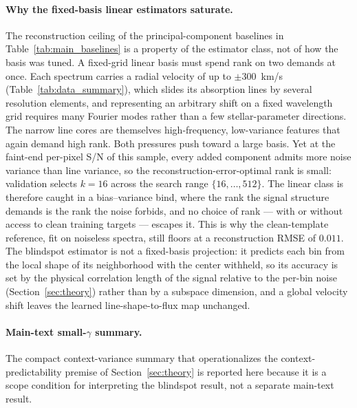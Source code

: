 \documentclass[twocolumn]{aastex7}
\begin{document}
\paragraph{Why the fixed-basis linear estimators saturate.} The reconstruction ceiling of the principal-component baselines in Table~\ref{tab:main_baselines} is a property of the estimator class, not of how the basis was tuned. A fixed-grid linear basis must spend rank on two demands at once. Each spectrum carries a radial velocity of up to $\pm300$~km/s (Table~\ref{tab:data_summary}), which slides its absorption lines by several resolution elements, and representing an arbitrary shift on a fixed wavelength grid requires many Fourier modes rather than a few stellar-parameter directions. The narrow line cores are themselves high-frequency, low-variance features that again demand high rank. Both pressures push toward a large basis. Yet at the faint-end per-pixel S/N of this sample, every added component admits more noise variance than line variance, so the reconstruction-error-optimal rank is small: validation selects $k=16$ across the search range $\{16,\dots,512\}$. The linear class is therefore caught in a bias--variance bind, where the rank the signal structure demands is the rank the noise forbids, and no choice of rank --- with or without access to clean training targets --- escapes it. This is why the clean-template reference, fit on noiseless spectra, still floors at a reconstruction RMSE of $0.011$. The blindspot estimator is not a fixed-basis projection: it predicts each bin from the local shape of its neighborhood with the center withheld, so its accuracy is set by the physical correlation length of the signal relative to the per-bin noise (Section~\ref{sec:theory}) rather than by a subspace dimension, and a global velocity shift leaves the learned line-shape-to-flux map unchanged.

\paragraph{Main-text small-$\gamma$ summary.}
\label{app:context_recoverability}
The compact context-variance summary that operationalizes the context-predictability premise of Section~\ref{sec:theory} is reported here because it is a scope condition for interpreting the blindspot result, not a separate main-text result.
\end{document}

